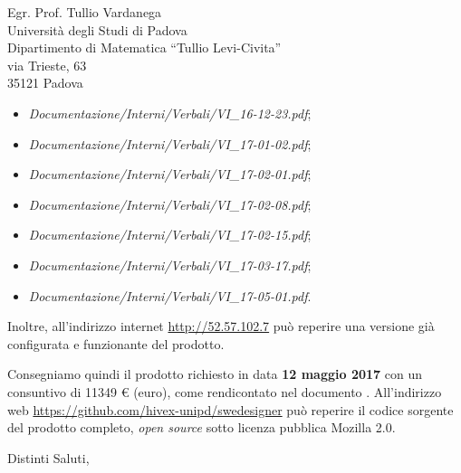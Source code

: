 \documentclass[a4paper]{letter} %
\begin{document}
\begin{letter}{Egr. Prof. Tullio Vardanega\\
Università degli Studi di Padova\\
Dipartimento di Matematica “Tullio Levi-Civita”\\
via Trieste, 63\\
35121 Padova}
\begin{itemize}
\begin{itemize}
		\item \emph{Documentazione/Interni/Verbali/}\emph{VI\_16-12-23.pdf};
		\item \emph{Documentazione/Interni/Verbali/}\emph{VI\_17-01-02.pdf};
		\item \emph{Documentazione/Interni/Verbali/}\emph{VI\_17-02-01.pdf};
		\item \emph{Documentazione/Interni/Verbali/}\emph{VI\_17-02-08.pdf};
		\item \emph{Documentazione/Interni/Verbali/}\emph{VI\_17-02-15.pdf};
		\item \emph{Documentazione/Interni/Verbali/}\emph{VI\_17-03-17.pdf};
		\item \emph{Documentazione/Interni/Verbali/}\emph{VI\_17-05-01.pdf}.
	\end{itemize}
\end{itemize}
Inoltre, all'indirizzo internet \url{http://52.57.102.7} può reperire una versione già configurata e funzionante del prodotto.

Consegniamo quindi il prodotto richiesto in data \textbf{12 maggio 2017} con un consuntivo di \num{11349} \euro{} (euro), come rendicontato nel documento \PdP. All'indirizzo web \url{https://github.com/hivex-unipd/swedesigner} può reperire il codice sorgente del prodotto completo, \emph{open source} sotto licenza pubblica Mozilla 2.0.

\closing{Distinti Saluti,}

\end{letter}
\end{document}
